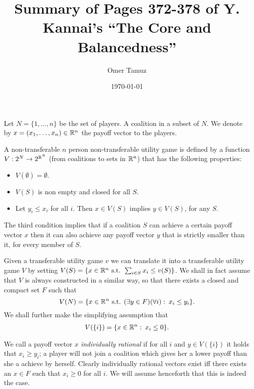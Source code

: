 \documentclass[11pt]{article} \usepackage{amssymb}
\begin{document}
\title{Summary of Pages 372-378 of Y. Kannai's ``The Core and
  Balancedness''}

\author{Omer Tamuz}
\date{\today}

\maketitle

Let $N=\{1,\ldots,n\}$ be the set of players. A coalition in a subset
of $N$. We denote by $x=(x_1,\ldots,x_n) \in \mathbb R^n$ the payoff vector
to the players.

A non-transferable $n$ person non-transferable utility game is defined
by a function $V:2^N \to 2^{\mathbb R^N}$ (from coalitions to sets in $\mathbb R^n$)
that has the following properties:
\begin{itemize}
\item $V(\emptyset) = \emptyset$.
\item $V(S)$ is non empty and closed for all $S$.
\item Let $y_i \leq x_i$ for all $i$. Then $x \in V(S)$ implies $y \in
  V(S)$, for any $S$.
\end{itemize}
The third condition implies that if a coalition $S$ can achieve a certain
payoff vector $x$ then it can also achieve any payoff vector $y$ that
is strictly smaller than it, for every member of $S$.

Given a transferable utility game $v$ we can translate it into a
transferable utility game $V$ by setting $V(S)=\{x \in \mathbb R^n \mbox{
  s.t. } \sum_{i \in S}x_i \leq v(S)\}$. We shall in fact assume that
$V$ is always constructed in a similar way, so that there exists a
closed and compact set $F$ such that
\begin{equation}
  \label{eq:F}
  V(N)=\{x \in \mathbb R^n \mbox{
    s.t. } (\exists y \in F)(\forall i):\:x_i \leq y_i\}.  
\end{equation}
We shall further make the simplifying assumption that
\begin{align}
  \label{eq:zero}
  V(\{i\}) = \{x \in \mathbb R^n :\: x_i \leq 0\}.
\end{align}

We call a payoff vector $x$ {\em individually rational} if for all $i$
and $y \in V(\{i\})$ it holds that $x_i \geq y_i$; a player will not
join a coalition which gives her a lower payoff than she a achieve by
herself. Clearly individually rational vectors exist iff there exists
an $x \in F$ such that $x_i \geq 0$ for all $i$. We will assume
henceforth that this is indeed the case.
\end{document}
